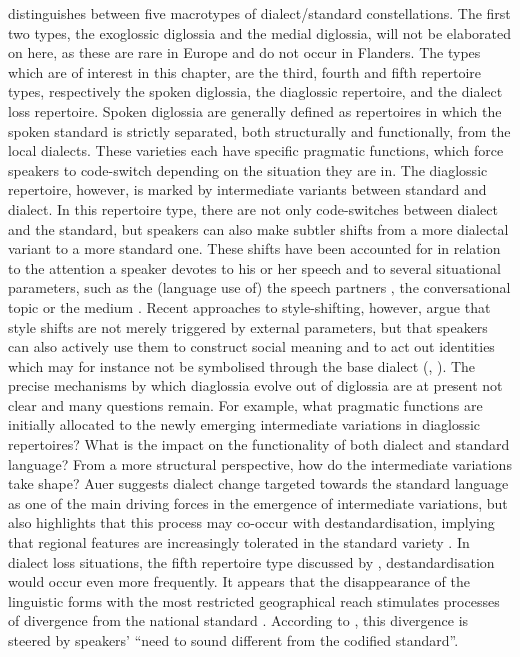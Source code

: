 \documentclass[output=paper]{LSP/langsci}
\begin{document}
\citet{auer_europes_2005,auer_dialect_2011} distinguishes between five macrotypes of dialect/standard constellations. The first two types, the exoglossic diglossia and the medial diglossia, will not be elaborated on here, as these are rare in Europe and do not occur in Flanders. The types which are of interest in this chapter, are the third, fourth and fifth repertoire types, respectively the spoken diglossia, the diaglossic repertoire, and the dialect loss repertoire. Spoken diglossia are generally defined as repertoires in which the spoken standard is strictly separated, both structurally and functionally, from the local dialects. These varieties each have specific pragmatic functions, which force speakers to code-switch depending on the situation they are in. The diaglossic repertoire, however, is marked by intermediate variants between standard and dialect. In this repertoire type, there are not only code-switches between dialect and the standard, but speakers can also make subtler shifts from a more dialectal variant to a more standard one. These shifts have been accounted for in relation to the attention a speaker devotes to his or her speech \citep[208]{labov_sociolinguistic_1972} and to several situational parameters, such as the (language use of) the speech partners \citep{bell_language_1984}, the conversational topic or the medium \citep{giles_speech_1975}. Recent approaches to style-shifting, however, argue that style shifts are not merely triggered by external parameters, but that speakers can also actively use them to construct social meaning and to act out identities which may for instance not be symbolised through the base dialect (\citealt[23]{auer_europes_2005}, \citealt[378]{schilling-estes_investigating_2002}). The precise mechanisms by which diaglossia evolve out of diglossia are at present not clear and many questions remain. For example, what pragmatic functions are initially allocated to the newly emerging intermediate variations in diaglossic repertoires? What is the impact on the functionality of both dialect and standard language? From a more structural perspective, how do the intermediate variations take shape? Auer suggests dialect change targeted towards the standard language as one of the main driving forces in the emergence of intermediate variations, but also highlights that this process may co-occur with destandardisation, implying that regional features are increasingly tolerated in the standard variety \citep[25]{auer_europes_2005}. In dialect loss situations, the fifth repertoire type discussed by \citet{auer_europes_2005,auer_dialect_2011}, destandardisation would occur even more frequently. It appears that the disappearance of the linguistic forms with the most restricted geographical reach stimulates processes of divergence from the national standard \citep[30]{auer_europes_2005}. According to \citet[30]{auer_europes_2005}, this divergence is steered by speakers’ “need to sound different from the codified standard”. 
\end{document}
